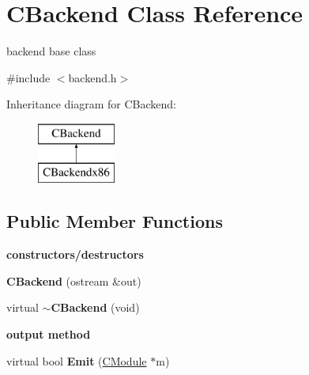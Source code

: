 \hypertarget{classCBackend}{\section{C\-Backend Class Reference}
\label{classCBackend}
}


backend base class  




{\ttfamily \#include $<$backend.\-h$>$}

Inheritance diagram for C\-Backend\-:\begin{figure}[H]
\begin{center}
\leavevmode
\includegraphics[height=2.000000cm]{classCBackend}
\end{center}
\end{figure}
\subsection*{Public Member Functions}
\begin{Indent}{\bf constructors/destructors}\par
\begin{DoxyCompactItemize}
\item 
\hypertarget{classCBackend_ad875445deb48ea45a76fcde40ccb507d}{{\bfseries C\-Backend} (ostream \&out)}\label{classCBackend_ad875445deb48ea45a76fcde40ccb507d}

\item 
\hypertarget{classCBackend_a510e5855c5548a760babe4fc22253d05}{virtual {\bfseries $\sim$\-C\-Backend} (void)}\label{classCBackend_a510e5855c5548a760babe4fc22253d05}

\end{DoxyCompactItemize}
\end{Indent}
\begin{Indent}{\bf output method}\par
\begin{DoxyCompactItemize}
\item 
\hypertarget{classCBackend_a9f522f47e88cc4719b92610004226300}{virtual bool {\bfseries Emit} (\hyperlink{classCModule}{C\-Module} $\ast$m)}\label{classCBackend_a9f522f47e88cc4719b92610004226300}

\end{DoxyCompactItemize}
\end{Indent}
